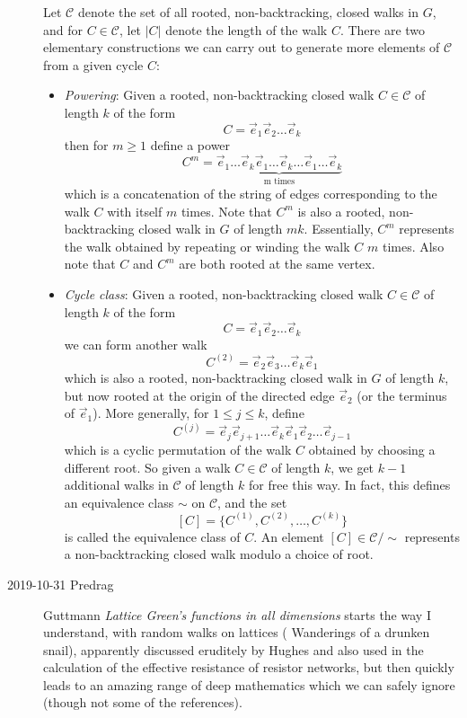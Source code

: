 \begin{description}
Let $\mathcal{C}$ denote the set of all rooted, non-backtracking, closed walks in $G$, and for $C \in \mathcal{C}$, let $|C|$ denote the length of the walk $C$. There are two elementary constructions we can carry out to generate more elements of $\mathcal{C}$ from a given cycle $C$:
\begin{itemize}
\item \emph{Powering}: Given a rooted, non-backtracking closed walk $C \in \mathcal{C}$ of length $k$ of the form
$$C=\vec{e}_1\vec{e}_2\dots\vec{e}_k$$
then for $m \geq 1$ define a power
$$C^m = \underbrace{\vec{e}_1\dots\vec{e}_k \vec{e}_1\dots\vec{e}_k \dots \vec{e}_1\dots\vec{e}_k}_{\text{m times}}$$
which is a concatenation of the string of edges corresponding to the walk $C$ with itself $m$ times. Note that $C^m$ is also a rooted, non-backtracking closed walk in $G$ of length $mk$. Essentially, $C^m$ represents the walk obtained by repeating or winding the walk $C$ $m$ times. Also note that $C$ and $C^m$ are both rooted at the same vertex.
\item \emph{Cycle class}: Given a rooted, non-backtracking closed walk $C \in \mathcal{C}$ of length $k$ of the form
$$C=\vec{e}_1\vec{e}_2\dots\vec{e}_k$$
we can form another walk
$$C^{(2)}=\vec{e}_2 \vec{e}_3 \dots \vec{e}_k \vec{e}_1$$
which is also a rooted, non-backtracking closed walk in $G$ of length $k$, but now rooted at the origin of the directed edge $\vec{e}_2$ (or the terminus of $\vec{e}_1$). More generally, for $1 \leq j \leq k$, define
$$C^{(j)} = \vec{e}_j \vec{e}_{j+1} \dots \vec{e}_k \vec{e}_1 \vec{e}_2 \dots \vec{e}_{j-1}$$
which is a cyclic permutation of the walk $C$ obtained by choosing a different root. So given a walk $C \in \mathcal{C}$ of length $k$, we get $k-1$ additional walks in $\mathcal{C}$ of length $k$ for free this way. In fact, this defines an equivalence class $\sim$ on $\mathcal{C}$, and the set
$$[C]=\{C^{(1)},C^{(2)},\dots,C^{(k)} \}$$
is called the equivalence class of $C$. An element $[C] \in \mathcal{C}/\sim$ represents a non-backtracking closed walk modulo a choice of root.
\end{itemize}


\item[2019-10-31 Predrag] Guttmann
{\em Lattice {Green's} functions in all dimensions} starts the way I
understand, with random walks on lattices
(
{Wanderings of a drunken snail}), apparently discussed eruditely by
Hughes and also used in the calculation of the effective
resistance of resistor networks, but then quickly leads to
an amazing range of deep mathematics which we can safely ignore (though
not some of the references).


\end{description}
